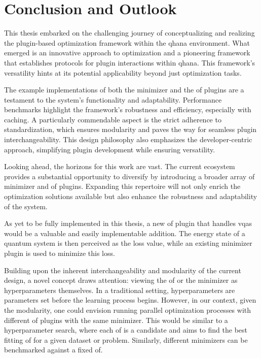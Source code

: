 \documentclass[
  a4paper,  %
  twoside,  %
  bibliography=totoc,
  headsepline,
  cleardoublepage=empty,
  parskip=half,
  draft=false
]{scrbook}
\begin{document}
{\chapter{Conclusion and Outlook}
\label{chap:conclusion}

This thesis embarked on the challenging journey of conceptualizing and realizing the plugin-based optimization framework within the \gls{qhana} environment.
What emerged is an innovative approach to optimization and a pioneering framework that establishes protocols for plugin interactions within \gls{qhana}.
This framework's versatility hints at its potential applicability beyond just optimization tasks.

The example implementations of both the minimizer and the \gls{of} plugins are a testament to the system's functionality and adaptability.
Performance benchmarks highlight the framework's robustness and efficiency, especially with caching.
A particularly commendable aspect is the strict adherence to standardization, which ensures modularity and paves the way for seamless plugin interchangeability.
This design philosophy also emphasizes the developer-centric approach, simplifying plugin development while ensuring versatility.

Looking ahead, the horizons for this work are vast.
The current ecosystem provides a substantial opportunity to diversify by introducing a broader array of minimizer and \gls{of} plugins.
Expanding this repertoire will not only enrich the optimization solutions available but also enhance the robustness and adaptability of the system.

As yet to be fully implemented in this thesis, a new \gls{of} plugin that handles \glspl{vqa} would be a valuable and easily implementable addition.
The energy state of a quantum system is then perceived as the loss value, while an existing minimizer plugin is used to minimize this loss.

Building upon the inherent interchangeability and modularity of the current design, a novel concept draws attention: viewing the \gls{of} or the minimizer as hyperparameters themselves.
In a traditional setting, hyperparameters are parameters set before the learning process begins.
However, in our context, given the modularity, one could envision running parallel optimization processes with different \gls{of} plugins with the same minimizer.
This would be similar to a hyperparameter search, where each \gls{of} is a candidate and aims to find the best fitting \gls{of} for a given dataset or problem.
Similarly, different minimizers can be benchmarked against a fixed \gls{of}.

}
\end{document}
